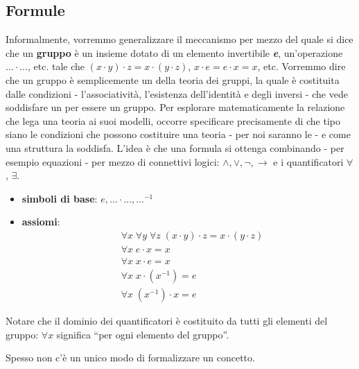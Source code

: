 \subsection{Formule}
Informalmente, vorremmo generalizzare il meccanismo per mezzo del quale si dice che un \textbf{gruppo} è un insieme dotato di un elemento invertibile \textbf{\textit{e}}, un'operazione $\ldots \cdot \ldots$, etc.
tale che $(x \cdot y) \cdot z = x \cdot (y \cdot z)$, $x \cdot e = e \cdot x = x$, etc. Vorremmo dire che un gruppo è semplicemente un  della teoria dei gruppi, la quale è costituita dalle condizioni -
l'associatività, l'esistenza dell'identità e degli inversi - che vede soddisfare un  per essere un gruppo. Per esplorare matematicamente la relazione che lega una teoria ai suoi modelli, occorre specificare 
precisamente di che tipo siano le condizioni che possono costituire una teoria - per noi saranno le  - e come una struttura la soddisfa.
L'idea è che una formula si ottenga combinando  - per esempio equazioni - per mezzo di connettivi logici: $\land,\lor,\neg,\to$ e i quantificatori $\forall$, $\exists$.

\begin{example}
    \emph{}\vspace{-0.7cm}
    \begin{itemize}
        \item \textbf{simboli di base}: $e,\ldots\cdot\ldots,\ldots^{-1}$
        \item \textbf{assiomi}:
        \begin{align*}
            &\forall x\; \forall y\; \forall z \; (x \cdot y) \cdot z = x \cdot (y \cdot z) \\
            &\forall x\; e \cdot x = x \\
            &\forall x\; x \cdot e = x \\
            &\forall x\; x \cdot (x^{-1}) = e \\
            &\forall x\; (x^{-1}) \cdot x = e
        \end{align*}
    \end{itemize}
    Notare che il dominio dei quantificatori è costituito da tutti gli elementi del gruppo: $\forall x$ significa ``per ogni elemento del gruppo''.
\end{example}

Spesso non c'è un unico modo di formalizzare un concetto.

